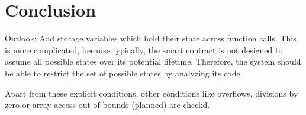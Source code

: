 \section{Conclusion}

Outlook: Add storage variables which hold their state across function calls.
This is more complicated, because typically, the smart contract is not designed
to assume all possible states over its potential lifetime. Therefore, the
system should be able to restrict the set of possible states by analyzing
its code.

Apart from these explicit conditions, other conditions like overflows,
divisions by zero or array access out of bounds (planned) are checkd.